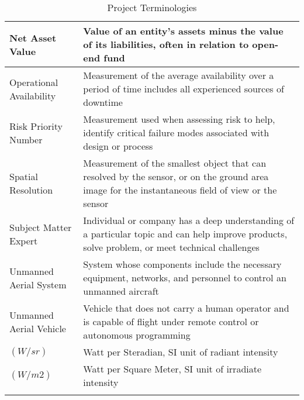 \documentclass[
	letterpaper, %
	12pt, %
]{CSSullivanBusinessReport}
\begin{document}
\begin{appendices}
\begin{longtable}{| p{6cm} | p{11cm} |}
        \hline
        Net Asset Value & Value of an entity’s assets minus the value of its liabilities, often in relation to open-end fund \\
        \hline
        Operational Availability & Measurement of the average availability over a period of time includes all experienced sources of downtime \\
        \hline
        Risk Priority Number & Measurement used when assessing risk to help, identify critical failure modes associated with design or process \\
        \hline
        Spatial Resolution & Measurement of the smallest object that can resolved by the sensor, or on the ground area image for the instantaneous field of view or the sensor \\
        \hline
        Subject Matter Expert & Individual or company has a deep understanding of a particular topic and can help improve products, solve problem, or meet technical challenges \\
        \hline
        Unmanned Aerial System & System whose components include the necessary equipment, networks, and personnel to control an unmanned aircraft \\
        \hline
        Unmanned Aerial Vehicle & Vehicle that does not carry a human operator and is capable of flight under remote control or autonomous programming \\
        \hline
        $(W/sr)$ & Watt per Steradian, SI unit of radiant intensity \\
        \hline
        $(W/m2)$ & Watt per Square Meter, SI unit of irradiate intensity\\
        \hline
    \caption{Project Terminologies}
    \label{tab:project_terms}
    \end{longtable}

\end{appendices}

\end{document}
